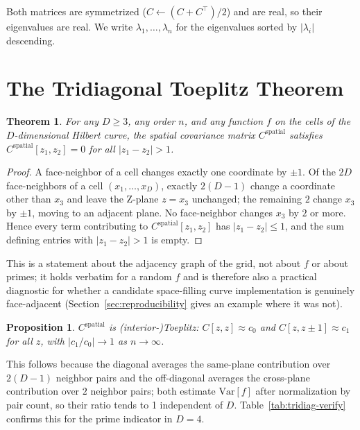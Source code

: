\documentclass[11pt,a4paper]{article}
\newtheorem{theorem}{Theorem}
\newtheorem{proposition}{Proposition}
\begin{document}
Both matrices are symmetrized ($C \leftarrow (C+C^\top)/2$) and are
real, so their eigenvalues are real. We write $\lambda_1,\ldots,\lambda_n$
for the eigenvalues sorted by $|\lambda_i|$ descending.

\section{The Tridiagonal Toeplitz Theorem}
\label{sec:tridiag}

\begin{theorem}
\label{thm:tridiag}
For any $D \geq 3$, any order $n$, and any function $f$ on the cells of the
$D$-dimensional Hilbert curve, the spatial covariance matrix
$C^{\mathrm{spatial}}$ satisfies $C^{\mathrm{spatial}}[z_1,z_2] = 0$ for all
$|z_1-z_2| > 1$.
\end{theorem}

\begin{proof}
A face-neighbor of a cell changes exactly one coordinate by $\pm 1$. Of the
$2D$ face-neighbors of a cell $(x_1,\ldots,x_D)$, exactly $2(D-1)$ change a
coordinate other than $x_3$ and leave the Z-plane $z=x_3$ unchanged; the
remaining $2$ change $x_3$ by $\pm 1$, moving to an adjacent plane. No
face-neighbor changes $x_3$ by $2$ or more. Hence every term contributing to
$C^{\mathrm{spatial}}[z_1,z_2]$ has $|z_1-z_2|\le 1$, and the sum defining
entries with $|z_1-z_2|>1$ is empty.
\end{proof}

This is a statement about the adjacency graph of the grid, not about $f$ or
about primes; it holds verbatim for a random $f$ and is therefore also a
practical diagnostic for whether a candidate space-filling curve
implementation is genuinely face-adjacent (Section~\ref{sec:reproducibility}
gives an example where it was not).

\begin{proposition}
\label{prop:toeplitz}
$C^{\mathrm{spatial}}$ is (interior-)Toeplitz: $C[z,z]\approx c_0$ and
$C[z,z\pm1]\approx c_1$ for all $z$, with
$|c_1/c_0| \to 1$ as $n \to \infty$.
\end{proposition}

This follows because the diagonal averages the same-plane contribution over
$2(D-1)$ neighbor pairs and the off-diagonal averages the cross-plane
contribution over $2$ neighbor pairs; both estimate $\mathrm{Var}[f]$ after
normalization by pair count, so their ratio tends to 1 independent of $D$.
Table~\ref{tab:tridiag-verify} confirms this for the prime indicator in
$D=4$.
\end{document}
